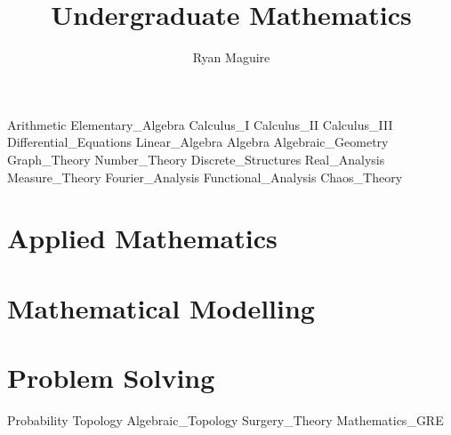 \documentclass[crop=false,class=book,oneside]{standalone}
\begin{document}
    \newif\ifmathcourses
    \ifx\ifcourses\undefined
        \title{Undergraduate Mathematics}
        \author{Ryan Maguire}
        \date{\vspace{-5ex}}
        \maketitle
        \tableofcontents
        \listoffigures
        \listoftables
        \clearpage
    \fi
    {Arithmetic}
    {Elementary_Algebra}
    {Calculus_I}
    {Calculus_II}
    {Calculus_III}
    {Differential_Equations}
    {Linear_Algebra}
    {Algebra}
    {Algebraic_Geometry}
    {Graph_Theory}
    {Number_Theory}
    {Discrete_Structures}
    {Real_Analysis}
    {Measure_Theory}
    {Fourier_Analysis}
    {Functional_Analysis}
    {Chaos_Theory}
    \chapter{Applied Mathematics}
    \chapter{Mathematical Modelling}
    \chapter{Problem Solving}
    {Probability}
    {Topology}
    {Algebraic_Topology}
    {Surgery_Theory}
    {Mathematics_GRE}
\end{document}
